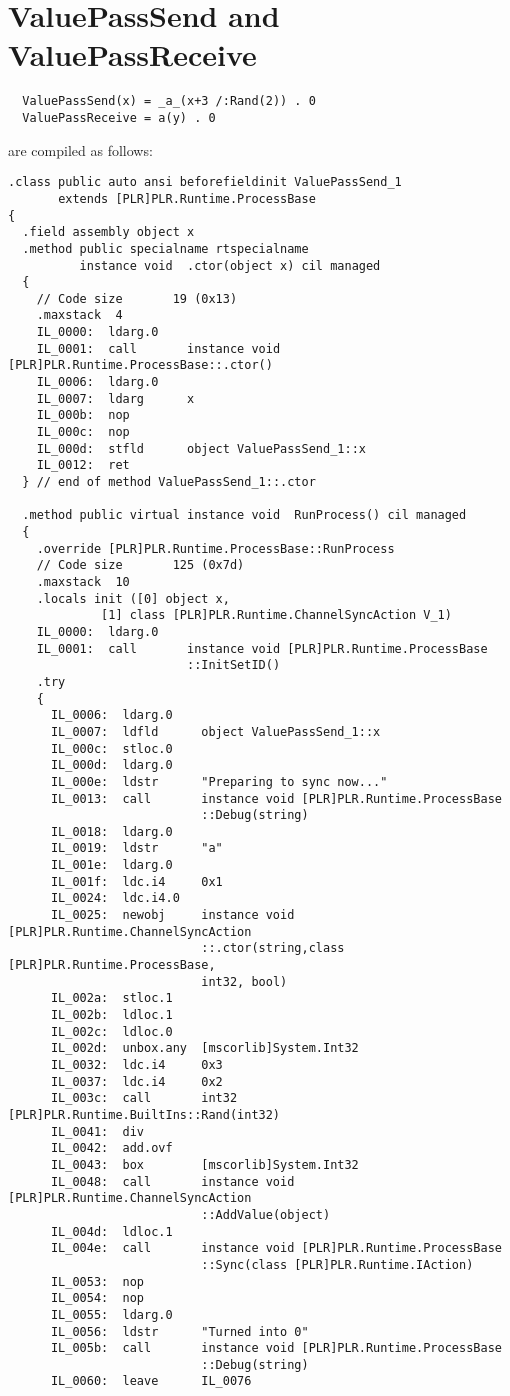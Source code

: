 \section{ValuePassSend and ValuePassReceive}

	\begin{verbatim}
  ValuePassSend(x) = _a_(x+3 /:Rand(2)) . 0
  ValuePassReceive = a(y) . 0
	\end{verbatim}
	
	are compiled as follows:

\begin{lstlisting}
.class public auto ansi beforefieldinit ValuePassSend_1
       extends [PLR]PLR.Runtime.ProcessBase
{
  .field assembly object x
  .method public specialname rtspecialname 
          instance void  .ctor(object x) cil managed
  {
    // Code size       19 (0x13)
    .maxstack  4
    IL_0000:  ldarg.0
    IL_0001:  call       instance void [PLR]PLR.Runtime.ProcessBase::.ctor()
    IL_0006:  ldarg.0
    IL_0007:  ldarg      x
    IL_000b:  nop
    IL_000c:  nop
    IL_000d:  stfld      object ValuePassSend_1::x
    IL_0012:  ret
  } // end of method ValuePassSend_1::.ctor

  .method public virtual instance void  RunProcess() cil managed
  {
    .override [PLR]PLR.Runtime.ProcessBase::RunProcess
    // Code size       125 (0x7d)
    .maxstack  10
    .locals init ([0] object x,
             [1] class [PLR]PLR.Runtime.ChannelSyncAction V_1)
    IL_0000:  ldarg.0
    IL_0001:  call       instance void [PLR]PLR.Runtime.ProcessBase
                         ::InitSetID()
    .try
    {
      IL_0006:  ldarg.0
      IL_0007:  ldfld      object ValuePassSend_1::x
      IL_000c:  stloc.0
      IL_000d:  ldarg.0
      IL_000e:  ldstr      "Preparing to sync now..."
      IL_0013:  call       instance void [PLR]PLR.Runtime.ProcessBase
                           ::Debug(string)
      IL_0018:  ldarg.0
      IL_0019:  ldstr      "a"
      IL_001e:  ldarg.0
      IL_001f:  ldc.i4     0x1
      IL_0024:  ldc.i4.0
      IL_0025:  newobj     instance void [PLR]PLR.Runtime.ChannelSyncAction
                           ::.ctor(string,class [PLR]PLR.Runtime.ProcessBase,
                           int32, bool)
      IL_002a:  stloc.1
      IL_002b:  ldloc.1
      IL_002c:  ldloc.0
      IL_002d:  unbox.any  [mscorlib]System.Int32
      IL_0032:  ldc.i4     0x3
      IL_0037:  ldc.i4     0x2
      IL_003c:  call       int32 [PLR]PLR.Runtime.BuiltIns::Rand(int32)
      IL_0041:  div
      IL_0042:  add.ovf
      IL_0043:  box        [mscorlib]System.Int32
      IL_0048:  call       instance void [PLR]PLR.Runtime.ChannelSyncAction
                           ::AddValue(object)
      IL_004d:  ldloc.1
      IL_004e:  call       instance void [PLR]PLR.Runtime.ProcessBase
                           ::Sync(class [PLR]PLR.Runtime.IAction)
      IL_0053:  nop
      IL_0054:  nop
      IL_0055:  ldarg.0
      IL_0056:  ldstr      "Turned into 0"
      IL_005b:  call       instance void [PLR]PLR.Runtime.ProcessBase
                           ::Debug(string)
      IL_0060:  leave      IL_0076


\end{lstlisting}
